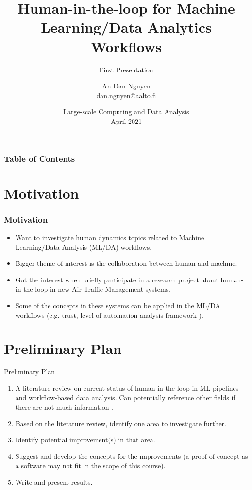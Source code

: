 \documentclass{beamer}
\title[HITL ML/DA Workflows] %
{Human-in-the-loop for Machine Learning/Data Analytics Workflows}
\subtitle{First Presentation}
\author[An Dan Nguyen] %
{An Dan Nguyen \\ dan.nguyen@aalto.fi}
\date[LSCA-2021] %
{Large-scale Computing and Data Analysis\\April 2021}
\begin{document}
\frame{\titlepage}

\begin{frame}
\frametitle{Table of Contents}
\tableofcontents
\end{frame}


\section{Motivation}
\begin{frame}
\frametitle{Motivation}

\begin{itemize}
    \item <1-> Want to investigate human dynamics topics related to Machine Learning/Data Analysis (ML/DA) workflows.
    \item <2-> Bigger theme of interest is the collaboration between human and machine.
    \item <3-> Got the interest when briefly participate in a research project about human-in-the-loop in new Air Traffic Management systems.
    \item <4-> Some of the concepts in these systems can be applied in the ML/DA workflows (e.g. trust, level of automation analysis framework \cite{lundberg2019human}).
\end{itemize}

\end{frame}


\section{Preliminary Plan}
\begin{frame}{Preliminary Plan}
\begin{enumerate}
    \item <1-> A literature review on current status of human-in-the-loop in ML pipelines and workflow-based data analysis. Can potentially reference other fields if there are not much information \cite{lundberg2019human}.
    \item <2-> Based on the literature review, identify one area to investigate further.
    \item <3-> Identify potential improvement(s) in that area.
    \item <4-> Suggest and develop the concepts for the improvements (a proof of concept as a software may not fit in the scope of this course).
    \item <5-> Write and present results.
\end{enumerate}
\end{frame}
\end{document}
